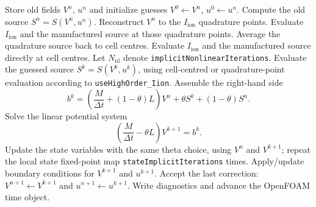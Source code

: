 \documentclass[11pt,a4paper]{article}
\newcommand{\code}[1]{\texttt{#1}}
\begin{document}
\begin{algorithm}[h]
\caption{One implicit time step in \code{highOrderManufacturedFDAImplicit}}
\label{alg:implicit-time-step}
\begin{algorithmic}[1]
\State Store old fields $V^n$, $u^n$ and initialize guesses $V^0\gets V^n$, $u^0\gets u^n$.
\State Compute the old source $S^n=S(V^n,u^n)$.
\If{\code{useHighOrder\_Iion=true}}
    \State Reconstruct $V^n$ to the $I_{\mathrm{ion}}$ quadrature points.
    \State Evaluate $I_{\mathrm{ion}}$ and the manufactured source at those quadrature points.
    \State Average the quadrature source back to cell centres.
\Else
    \State Evaluate $I_{\mathrm{ion}}$ and the manufactured source directly at cell centres.
\EndIf
\State Let $N_{\mathrm{nl}}$ denote \code{implicitNonlinearIterations}.
    \State Evaluate the guessed source $S^k=S(V^k,u^k)$, using cell-centred or quadrature-point evaluation according to \code{useHighOrder\_Iion}.
    \State Assemble the right-hand side
    \[
        b^k = \left(\frac{M}{\Delta t}+(1-\theta)L\right)V^n
        + \theta S^k + (1-\theta)S^n .
    \]
    \State Solve the linear potential system
    \[
        \left(\frac{M}{\Delta t}-\theta L\right)V^{k+1}=b^k .
    \]
    \State Update the state variables with the same theta choice, using $V^n$ and $V^{k+1}$; repeat the local state fixed-point map \code{stateImplicitIterations} times.
    \State Apply/update boundary conditions for $V^{k+1}$ and $u^{k+1}$.
\EndFor
\State Accept the last correction: $V^{n+1}\gets V^{k+1}$ and $u^{n+1}\gets u^{k+1}$.
\State Write diagnostics and advance the OpenFOAM time object.
\end{algorithmic}
\end{algorithm}
\end{document}
